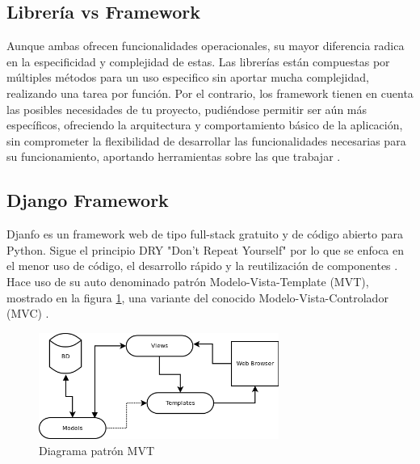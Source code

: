 \subsection{Librería vs Framework}
Aunque ambas ofrecen funcionalidades operacionales, su mayor diferencia radica en la especificidad y complejidad de estas. Las librerías están compuestas por múltiples métodos para un uso especifico sin aportar mucha complejidad, realizando una tarea por función.
\newline
\newline
Por el contrario, los framework tienen en cuenta las posibles necesidades de tu proyecto, pudiéndose permitir ser aún más específicos, ofreciendo la arquitectura y comportamiento básico de la aplicación, sin comprometer la flexibilidad de desarrollar las funcionalidades necesarias para su funcionamiento, aportando herramientas sobre las que trabajar \cite{glez2014web}.

\subsection{Django Framework}
Djanfo es un framework web de tipo full-stack gratuito y de código abierto para Python. Sigue el principio DRY "Don’t Repeat Yourself" por lo que se enfoca en el menor uso de código, el desarrollo rápido y la reutilización de componentes \cite{DjDF} \cite{alchin2013pro}.
\newline
\newline
Hace uso de su auto denominado patrón Modelo-Vista-Template (MVT), mostrado en la figura \ref{fig:ej1}, una variante del conocido Modelo-Vista-Controlador (MVC) \cite{ravindran2015django}.

\begin{figure} [H]
	\centering
	\includegraphics[width=0.7\textwidth]{fig/DjangoMVT.png}
	\caption[Diagrama patrón MVT]{Diagrama patrón MVT \footnotemark}
	\label{fig:ej1}
\end{figure}

